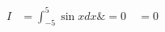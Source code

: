 \documentclass[preview]{standalone}
\begin{document}
\begin{align*}
I &= \int_{-5}^{5} \sin x dx \&= 0 \ &= 0
\end{align*}
\end{document}
